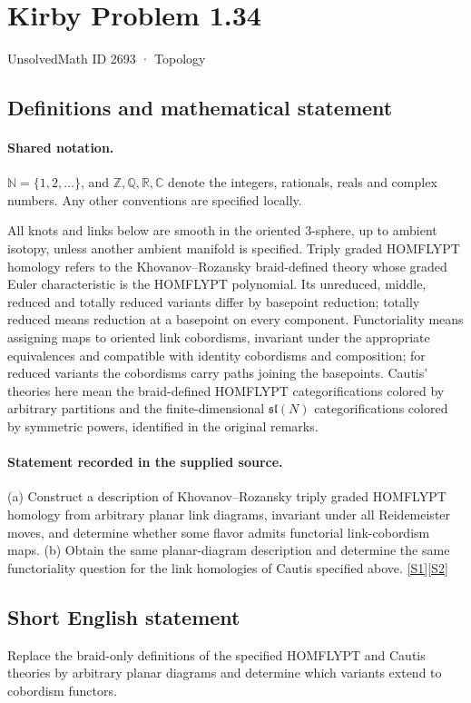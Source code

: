 \documentclass[11pt]{article}
\newcommand{\sref}[2]{\hyperlink{source:#1:#2}{[S#2]}}
\begin{document}
\setcounter{section}{2692}
\section{Kirby Problem 1.34}\label{2693}
{\small\sffamily UnsolvedMath ID 2693 · Topology}
\subsection{Definitions and mathematical statement}

\paragraph{Shared notation.}$\mathbb N=\{1,2,\ldots\}$, and $\mathbb Z,\mathbb Q,\mathbb R,\mathbb C$ denote the integers, rationals, reals and complex numbers. Any other conventions are specified locally.


All knots and links below are smooth in the oriented $3$-sphere, up to ambient isotopy, unless another ambient manifold is specified. Triply graded HOMFLYPT homology refers to the Khovanov--Rozansky braid-defined theory whose graded Euler characteristic is the HOMFLYPT polynomial. Its unreduced, middle, reduced and totally reduced variants differ by basepoint reduction; totally reduced means reduction at a basepoint on every component. Functoriality means assigning maps to oriented link cobordisms, invariant under the appropriate equivalences and compatible with identity cobordisms and composition; for reduced variants the cobordisms carry paths joining the basepoints. Cautis' theories here mean the braid-defined HOMFLYPT categorifications colored by arbitrary partitions and the finite-dimensional $\mathfrak{sl}(N)$ categorifications colored by symmetric powers, identified in the original remarks.
\paragraph{Statement recorded in the supplied source.}
(a) Construct a description of Khovanov--Rozansky triply graded HOMFLYPT homology from arbitrary planar link diagrams, invariant under all Reidemeister moves, and determine whether some flavor admits functorial link-cobordism maps. (b) Obtain the same planar-diagram description and determine the same functoriality question for the link homologies of Cautis specified above. \sref{2693}{1}\sref{2693}{2}
\subsection{Short English statement}
Replace the braid-only definitions of the specified HOMFLYPT and Cautis theories by arbitrary planar diagrams and determine which variants extend to cobordism functors.
\end{document}
